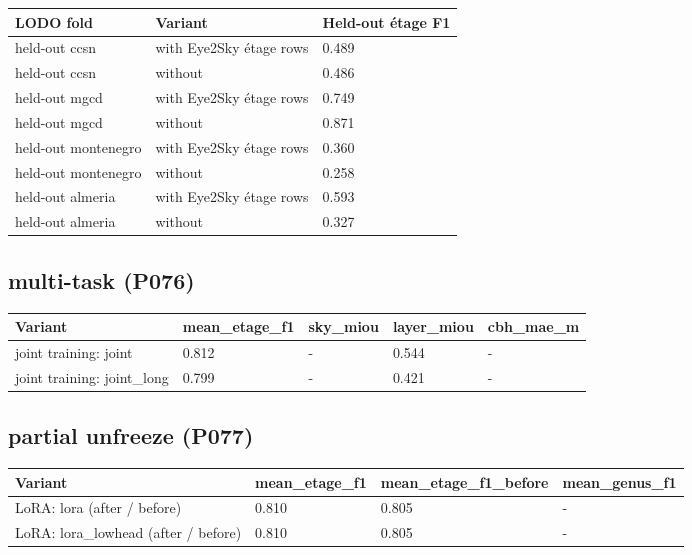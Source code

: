 \begin{center}{\scriptsize\setlength{\tabcolsep}{3pt}
\begin{tabular}{lll}
\toprule
LODO fold & Variant & Held-out étage F1 \\
\midrule
held-out ccsn & with Eye2Sky étage rows & 0.489 \\
held-out ccsn & without & 0.486 \\
held-out mgcd & with Eye2Sky étage rows & 0.749 \\
held-out mgcd & without & 0.871 \\
held-out montenegro & with Eye2Sky étage rows & 0.360 \\
held-out montenegro & without & 0.258 \\
held-out almeria & with Eye2Sky étage rows & 0.593 \\
held-out almeria & without & 0.327 \\
\bottomrule
\end{tabular}}
\end{center}

\subsection{multi-task (P076)}

\begin{center}{\scriptsize\setlength{\tabcolsep}{3pt}
\begin{tabular}{lllll}
\toprule
Variant & mean\_etage\_f1 & sky\_miou & layer\_miou & cbh\_mae\_m \\
\midrule
joint training: joint & 0.812 & - & 0.544 & - \\
joint training: joint\_long & 0.799 & - & 0.421 & - \\
\bottomrule
\end{tabular}}
\end{center}

\subsection{partial unfreeze (P077)}

\begin{center}{\scriptsize\setlength{\tabcolsep}{3pt}
\begin{tabular}{p{11.4cm}lll}
\toprule
Variant & mean\_etage\_f1 & mean\_etage\_f1\_before & mean\_genus\_f1 \\
\midrule
LoRA: lora (after / before) & 0.810 & 0.805 & - \\
LoRA: lora\_lowhead (after / before) & 0.810 & 0.805 & - \\
\bottomrule
\end{tabular}}
\end{center}

